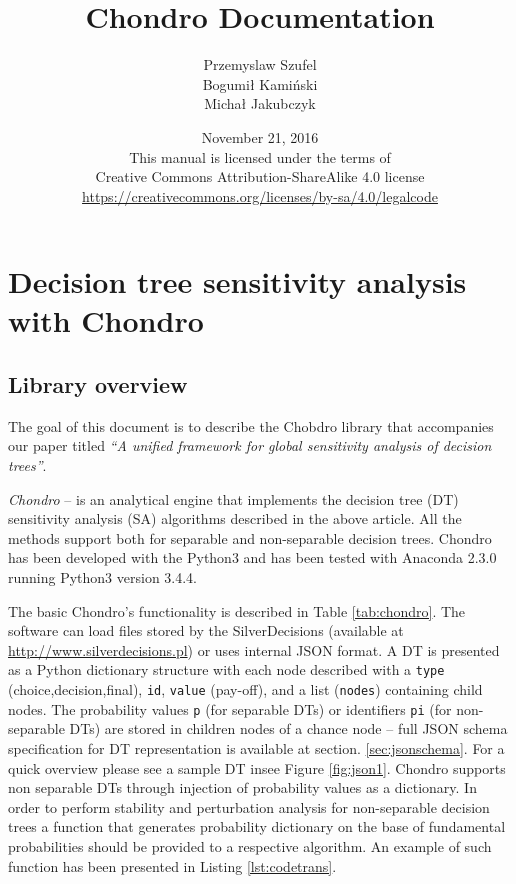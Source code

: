 \documentclass[a4paper,10pt,english]{sphinxmanual}
\title{Chondro Documentation}
\date{November 21, 2016
\\
This manual is licensed under the terms of\\Creative Commons Attribution-ShareAlike 4.0 license\\ \url{https://creativecommons.org/licenses/by-sa/4.0/legalcode}
}
\author{Przemyslaw Szufel \\ Bogumi{\l} Kami\'{n}ski \\ Micha{\l} Jakubczyk }
\begin{document}
	\lstset{language=Python}
	\maketitle

	
\chapter{Decision tree sensitivity analysis with Chondro}

\section{Library overview}
	The goal of this document is to describe the Chobdro library that accompanies our paper titled \emph{``A unified framework for global sensitivity analysis of decision trees''}.

	\emph{Chondro} -- is an analytical engine that implements the decision tree (DT) sensitivity analysis (SA) algorithms described in the above article. All the methods support both for separable and non-separable decision trees. Chondro has been developed with the Python3 and has been tested with Anaconda 2.3.0 running Python3 version 3.4.4. 
	
	The basic Chondro's functionality is described in Table \ref{tab:chondro}. The software can load files stored by the \mbox{SilverDecisions} (available at \url{http://www.silverdecisions.pl}) or uses internal JSON format. A DT is presented as a Python dictionary structure with each node described with a \texttt{type} (choice,decision,final), \texttt{id}, \texttt{value} (pay-off), and a list (\texttt{nodes}) containing child nodes. The probability values \texttt{p} (for separable DTs) or identifiers \texttt{pi} (for non-separable DTs)  are stored in children nodes of a chance node -- full JSON schema specification for DT representation is available at section.  \ref{sec:jsonschema}. For a quick overview please see a sample DT insee Figure \ref{fig:json1}.
	Chondro supports non separable DTs through  injection of probability values as a dictionary. In order to perform stability and perturbation analysis for non-separable decision trees a function that generates probability dictionary on the base of fundamental probabilities should be provided to a respective algorithm. An example of such function has been presented in Listing \ref{lst:codetrans}.
	
\end{document}

